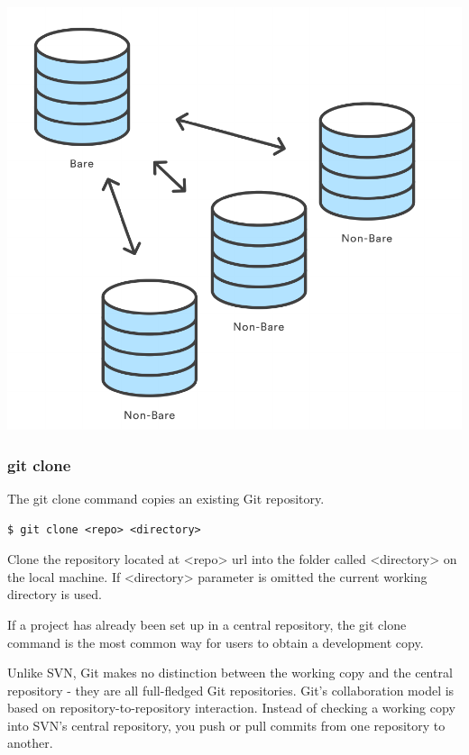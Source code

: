 \documentclass{article}
\begin{document}
\begin{center}
\includegraphics[scale=0.5]{figures/01.pdf}
\end{center}

\subsubsection*{git clone}

The git clone command copies an existing Git repository.

\begin{lstlisting}
$ git clone <repo> <directory>
\end{lstlisting}
Clone the repository located at <repo> url into the folder called
<directory> on the local machine. If <directory> parameter is omitted
the current working directory is used. 

If a project has already been set up in a central repository, the git
clone command is the most common way for users to obtain a development
copy.

Unlike SVN, Git makes no distinction between the working copy and the
central repository - they are all full-fledged Git repositories.
Git's collaboration model is based on repository-to-repository
interaction. Instead of checking a working copy into SVN's central
repository, you push or pull commits from one repository to another.
\end{document}
